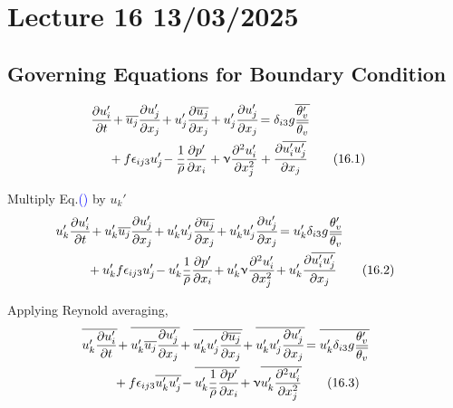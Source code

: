 \documentclass[fleqn,10pt]{SelfArx} %
\newcommand{\myeqref}[1]{Eq.\textcolor{blue}{\textup{(\getrefnumber{#1})}}}
\begin{document}
\clearpage

\section{Lecture 16 13/03/2025}
\subsection{Governing Equations for Boundary Condition}
\begin{align*}
	\mspace{-20mu} \frac{\partial u_i'}{\partial t} \! &+ \overline{u_j}\frac{\partial u_j'}{\partial x_j} \! + u_j'\frac{\partial \overline{u_j}}{\partial x_j} \! + u_j'\frac{\partial u_j'}{\partial x_j} \! = \delta_{i3}g \overline{\frac{\theta_v'}{\overline{\theta_v}}} \\ &\! + f\epsilon_{ij3}u_j' \! - \frac{1}{\overline{\rho}}\frac{\partial p'}{\partial x_i} + \upnu \frac{\partial^2 u_i'}{\partial x_j^2} + \frac{\partial \overline{u_i'u_j'}}{\partial x_j} \tag{16.1} \label{eq:16.1}
\end{align*}

Multiply \myeqref{eq:16.1} by \( u_k' \)
\begin{align*}
	\mspace{-28mu} u_k'\frac{\partial u_i'}{\partial t} \! &+ u_k'\overline{u_j}\frac{\partial u_j'}{\partial x_j} \! + u_k'u_j'\frac{\partial \overline{u_j}}{\partial x_j} \! + u_k'u_j'\frac{\partial u_j'}{\partial x_j} \! = u_k'\delta_{i3}g \frac{\theta_v'}{\overline{\theta_v}} \\ &\! + u_k'f\epsilon_{ij3}u_j' \! - u_k'\frac{1}{\overline{\rho}}\frac{\partial p'}{\partial x_i} \! + u_k'\upnu \frac{\partial^2 u_i'}{\partial x_j^2} \! + u_k'\frac{\partial \overline{u_i'u_j'}}{\partial x_j} \tag{16.2} \label{eq:16.2}
\end{align*}

Applying Reynold averaging,
\begin{align*}
	\mspace{-28mu} \overline{u_k'\frac{\partial u_i'}{\partial t}} \! &+ \overline{u_k'\overline{u_j}\frac{\partial u_j'}{\partial x_j}} \! + \overline{u_k'u_j'\frac{\partial \overline{u_j}}{\partial x_j}} \! + \overline{u_k'u_j'\frac{\partial u_j'}{\partial x_j}} \! = \overline{u_k'\delta_{i3}g\frac{\theta_v'}{\overline{\theta_v}}} \\ &\! + f\epsilon_{ij3}\overline{u_k'u_j'} \! - \overline{u_k'\frac{1}{\overline{\rho}}\frac{\partial p'}{\partial x_i}} \! + \upnu\overline{u_k'\frac{\partial^2 u_i'}{\partial x_j^2}} \tag{16.3} \label{eq:16.3}
\end{align*}
\end{document}

